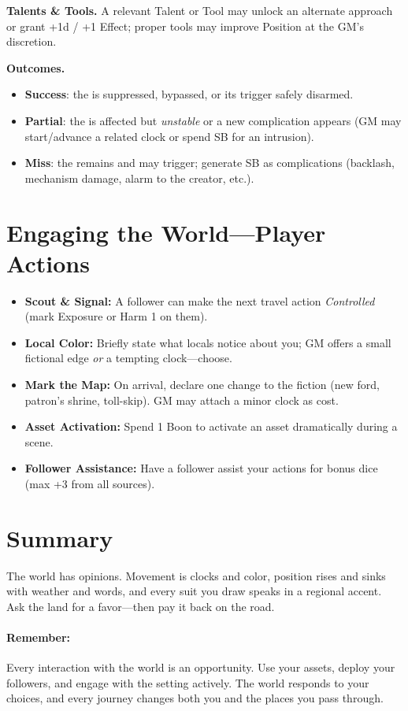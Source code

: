 \textbf{Talents \& Tools.} A relevant Talent or Tool may unlock an alternate approach or grant +1d / +1 Effect; proper tools may improve Position at the GM’s discretion.

\textbf{Outcomes.}
\begin{itemize}
  \item \textbf{Success}: the \WARD is suppressed, bypassed, or its trigger safely disarmed.
  \item \textbf{Partial}: the \WARD is affected but \emph{unstable} or a new complication appears (GM may start/advance a related clock or spend SB for an intrusion).
  \item \textbf{Miss}: the \WARD remains and may trigger; generate SB as complications (backlash, mechanism damage, alarm to the creator, etc.).
\end{itemize}

\section{Engaging the World—Player Actions}
\begin{itemize}
\item \textbf{Scout \& Signal:} A follower can make the next travel action \emph{Controlled} (mark Exposure or Harm 1 on them).
\item \textbf{Local Color:} Briefly state what locals notice about you; GM offers a small fictional edge \emph{or} a tempting clock—choose.
\item \textbf{Mark the Map:} On arrival, declare one change to the fiction (new ford, patron's shrine, toll-skip). GM may attach a minor clock as cost.
\item \textbf{Asset Activation:} Spend 1 Boon to activate an asset dramatically during a scene.
\item \textbf{Follower Assistance:} Have a follower assist your actions for bonus dice (max +3 from all sources).
\end{itemize}

\section{Summary}
The world has opinions. Movement is clocks and color, position rises and sinks with weather and words, and every suit you draw speaks in a regional accent. Ask the land for a favor—then pay it back on the road.

\paragraph{Remember:} Every interaction with the world is an opportunity. Use your assets, deploy your followers, and engage with the setting actively. The world responds to your choices, and every journey changes both you and the places you pass through.

